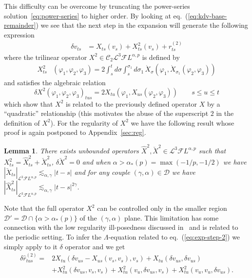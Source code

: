 \documentclass[a4paper,11pt,reqno]{article}
\newcommand{\der}{\delta}
\newcommand{\CC}{\mathcal{C}}
\newcommand{\DD}{\mathcal{D}}
\newcommand{\FF}{\mathcal{F}}
\newcommand{\LL}{\mathcal{L}}
\newtheorem{lemma}[theorem]{Lemma}
\begin{document}
This difficulty can be overcome by truncating the power-series solution~\eqref{eq:power-series}
to higher order. By looking at
eq.~(\ref{eq:kdv-base-remainder}) we see that the next step in the
expansion will generate the following expression
\begin{equation}
  \label{eq:exp-step-2}
  \begin{split}
 \der v_{ts} & =   X_{ts}(v_s)+X^2_{ts}(v_s)  + r^{(2)}_{ts}
  \end{split}
\end{equation}
where the  trilinear operator  $X^2 \in \CC_2 \LL^3 \FF L^{\alpha,p}$ is defined by
\begin{equation}
  \label{eq:X2}
  \begin{split}
 X^2_{ts}&(\varphi_1,\varphi_2,\varphi_3) = 2 \int_s^t d\sigma \int_s^{\sigma_1}d\sigma_1 \, \dot X_\sigma(\varphi_1,  \dot X_{\sigma_1}(\varphi_2, \varphi_3))
 \end{split}
\end{equation}
and satisfies the algebraic relation
\begin{equation}
  \label{eq:area-eq}
  \der X^2(\varphi_1,\varphi_2,\varphi_3)_{tus} = 2 X_{tu}(\varphi_1,X_{us}(\varphi_2,\varphi_3))
\qquad s\le u \le t
\end{equation}
which show that $X^2$ is related to the previously defined operator
$X$ by a ``quadratic'' relationship (this motivates the abuse of the superscript $2$
in the
definition of $X^2$).  
For the regularity of $X^2$ we have the following result whose proof  is again postponed to Appendix~\ref{sec:reg}.
\begin{lemma}
\label{lemma:X2}
There exists unbounded operators $\hat X^2, \breve X^2 \in \LL^3\FF L^{\alpha,p}$  such that $X^2_{ts}= \hat X^2_{ts}+\breve X^2_{ts}$, $\der \breve X^2 = 0$ and when $\alpha > \alpha_{*}(p)=\max( -1/p,-1/2)$ we have $|\breve X_{ts}|_{\LL^3 \FF L^{\alpha,p}} \lesssim_{\alpha,\gamma} |t-s|$ and for any couple
$(\gamma,\alpha) \in  \DD$
we have
$
|\hat X^2_{ts}|_{\LL^3 \FF L^{\alpha,p}} \lesssim_{\alpha,\gamma} |t-s|^{2\gamma} 
$.
\end{lemma}
Note that the full operator $X^2$ can be controlled only in the smaller
region $\DD'= \DD \cap \{\alpha> \alpha_{*}(p)\}$ of the $(\gamma,\alpha)$ plane. This limitation has some
connection with the low regularity ill-posedness discussed in~\cite{MR2018661} and is related to the periodic setting. 
To infer the $\Lambda$-equation  related to eq.~(\ref{eq:exp-step-2}) we simply apply to it $\der$ operator and we get
\begin{equation}
  \label{eq:abs-step-2-ur-rem}
  \begin{split}
\der \hat r^{(2)}_{tus} = & 2 X_{tu}(\der v_{us}- X_{us}(v_s,v_s),v_s) 
+ X_{tu}(\der v_{us},\der v_{us}) 
\\ & + X^2_{tu}(\der v_{us},v_s,v_s) +
X^2_{tu}(v_u,\der v_{us},v_s) + X^2_{tu}( v_u,v_u,\der v_{us}).     
  \end{split}
\end{equation}
\end{document}
